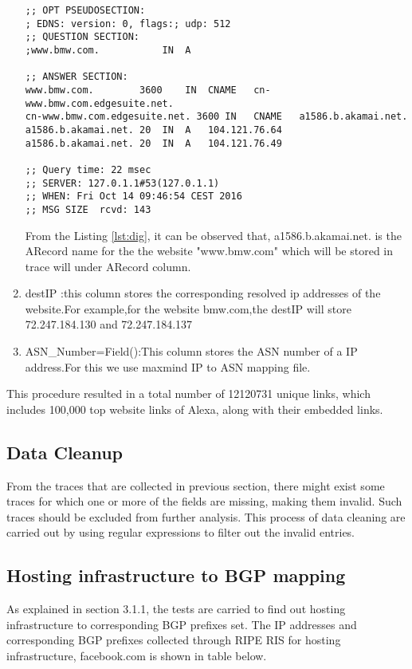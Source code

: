 \begin{enumerate}
\begin{lstlisting}[caption= DNS Reply for a host using dig command line tool, label=lst:dig]
;; OPT PSEUDOSECTION:
; EDNS: version: 0, flags:; udp: 512
;; QUESTION SECTION:
;www.bmw.com.			IN	A

;; ANSWER SECTION:
www.bmw.com.		3600	IN	CNAME	cn-www.bmw.com.edgesuite.net.
cn-www.bmw.com.edgesuite.net. 3600 IN	CNAME	a1586.b.akamai.net.
a1586.b.akamai.net.	20	IN	A	104.121.76.64
a1586.b.akamai.net.	20	IN	A	104.121.76.49

;; Query time: 22 msec
;; SERVER: 127.0.1.1#53(127.0.1.1)
;; WHEN: Fri Oct 14 09:46:54 CEST 2016
;; MSG SIZE  rcvd: 143
\end{lstlisting}


\noindent From the Listing \ref{lst:dig}, it can be observed that, a1586.b.akamai.net. is the ARecord name for the the website "www.bmw.com" which will be stored in trace will under ARecord column.\\
\item destIP :this column stores the corresponding resolved ip addresses of the website.For example,for the website bmw.com,the destIP will store 72.247.184.130 and 72.247.184.137
\item ASN\_Number=Field():This column stores the ASN number of a IP address.For this we use maxmind IP to ASN mapping file.
    \end{enumerate}
    
\noindent This procedure resulted in a total number of 12120731 unique links, which includes 100,000 top website links of Alexa, along with their embedded links.\\

\subsection{Data Cleanup}
\noindent From the traces that are collected in previous section, there might exist some traces for which one or more of the fields are missing, making them invalid. Such traces should be excluded from further analysis. This process of data cleaning are carried out by using regular expressions to filter out the invalid entries.\\

\subsection{Hosting infrastructure to BGP mapping}
\noindent As explained in section 3.1.1, the tests are carried to find out hosting infrastructure to corresponding BGP prefixes set. The IP addresses and corresponding BGP prefixes collected through RIPE RIS for hosting infrastructure, facebook.com is shown in table below.\\\

